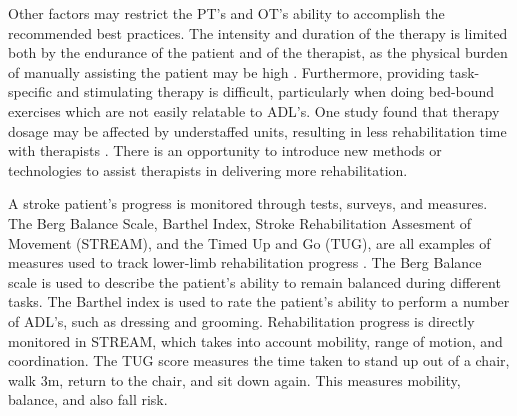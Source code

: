 \documentclass[12pt]{report}
\begin{document}
Other factors may restrict the PT's and OT's ability to accomplish the recommended best practices. The intensity and duration of the therapy is limited both by the endurance of the patient and of the therapist, as the physical burden of manually assisting the patient may be high \cite{Colombo}. Furthermore, providing task-specific and stimulating therapy is difficult, particularly when doing bed-bound exercises which are not easily relatable to ADL's. One study found that therapy dosage may be affected by understaffed units, resulting in less rehabilitation time with therapists \cite{Mchugh2013}. There is an opportunity to introduce new methods or technologies to assist therapists in delivering more rehabilitation.

A stroke patient's progress is monitored through tests, surveys, and measures. The Berg Balance Scale, Barthel Index, Stroke Rehabilitation Assesment of Movement (STREAM), and the Timed Up and Go (TUG), are all examples of measures used to track lower-limb rehabilitation progress \cite{Salbach2001}. The Berg Balance scale is used to describe the patient's ability to remain balanced during different tasks. The Barthel index is used to rate the patient's ability to perform a number of ADL's, such as dressing and grooming. Rehabilitation progress is directly monitored in STREAM, which takes into account mobility, range of motion, and coordination. The TUG score measures the time taken to stand up out of a chair, walk 3m, return to the chair, and sit down again. This measures mobility, balance, and also fall risk. 

\end{document}
